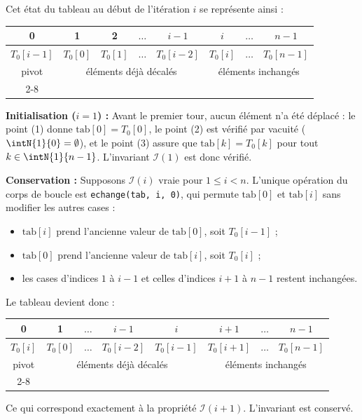 \documentclass[11pt,a4paper]{article}
\begin{document}
\begin{Exercise}[title = {Rotation droite d'un tableau}]
{	Cet état du tableau au début de l'itération $i$ se représente ainsi :
	\begin{center}
	\begin{tabular}{|c|c|c|c|c|c|c|c|}
		\hline
		0 & 1 & 2 & $\dots$ & $i-1$ & $i$ & $\dots$ & $n-1$ \\
		\hline
		$T_0[i-1]$ & $T_0[0]$ & $T_0[1]$ & $\dots$ & $T_0[i-2]$ & $T_0[i]$ & $\dots$ & $T_0[n-1]$ \\
		\hline
		\multicolumn{1}{c|}{pivot} & \multicolumn{4}{c|}{éléments déjà décalés} & \multicolumn{3}{c|}{éléments inchangés} \\
		\cline{2-8}
	\end{tabular}
	\end{center}

	\textbf{Initialisation ($i = 1$) :}
	Avant le premier tour, aucun élément n'a été déplacé : le point (1) donne $\text{tab}[0] = T_0[0]$, le point (2) est vérifié par vacuité ($\intN{1}{0} = \emptyset$), et le point (3) assure que $\text{tab}[k] = T_0[k]$ pour tout $k \in \intN{1}{n-1}$. L'invariant $\mathcal{I}(1)$ est donc vérifié.

	\textbf{Conservation :}
	Supposons $\mathcal{I}(i)$ vraie pour $1 \leqslant i < n$.
	L'unique opération du corps de boucle est \texttt{echange(tab, i, 0)}, qui permute $\text{tab}[0]$ et $\text{tab}[i]$ sans modifier les autres cases :
	\begin{itemize}
		\item $\text{tab}[i]$ prend l'ancienne valeur de $\text{tab}[0]$, soit $T_0[i-1]$ ;
		\item $\text{tab}[0]$ prend l'ancienne valeur de $\text{tab}[i]$, soit $T_0[i]$ ;
		\item les cases d'indices $1$ à $i-1$ et celles d'indices $i+1$ à $n-1$ restent inchangées.
	\end{itemize}
	Le tableau devient donc :
	\begin{center}
	\begin{tabular}{|c|c|c|c|c|c|c|c|}
		\hline
		0 & 1 & $\dots$ & $i-1$ & $i$ & $i+1$ & $\dots$ & $n-1$ \\
		\hline
		$T_0[i]$ & $T_0[0]$ & $\dots$ & $T_0[i-2]$ & $T_0[i-1]$ & $T_0[i+1]$ & $\dots$ & $T_0[n-1]$ \\
		\hline
		\multicolumn{1}{c|}{pivot} & \multicolumn{4}{c|}{éléments déjà décalés} & \multicolumn{3}{c|}{éléments inchangés} \\
		\cline{2-8}
	\end{tabular}
	\end{center}
	Ce qui correspond exactement à la propriété $\mathcal{I}(i+1)$. L'invariant est conservé.

}
\end{Exercise}
\end{document}

